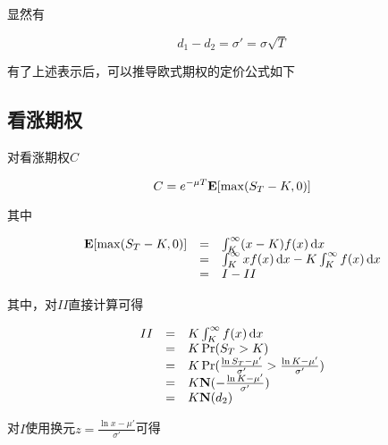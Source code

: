 显然有

\begin{equation*}
    d_1 - d_2 = \sigma' = \sigma \sqrt{T}
\end{equation*}

有了上述表示后，可以推导欧式期权的定价公式如下

\subsection{看涨期权}

对看涨期权$C$

\begin{equation}
    C = e^{-\mu T}\mathbf{E}[\max (S_T- K,0)]
\end{equation}

其中

\begin{equation}
    \begin{array}{rcl}
        \mathbf{E}[\max (S_T- K,0)] & = & \int_K^\infty(x - K)f(x) \,\mathrm{d} x                         \\
                            & = & \int_K^\infty xf(x) \,\mathrm{d} x - K \int_K^\infty f(x) \,\mathrm{d} x \\
                            & = & I - II
    \end{array}
\end{equation}

其中，对$II$直接计算可得

\begin{equation}
    \begin{array}{rcl}
        II & = & K \int_K^\infty f(x) \,\mathrm{d} x                                           \\
           & = & K \Pr(S_T > K)                                                       \\
           & = & K \Pr(\frac{\ln S_T - \mu'}{\sigma'} > \frac{\ln K - \mu'}{\sigma'}) \\
           & = & K \mathbf{N}( - \frac{\ln K - \mu'}{\sigma'})                                \\
           & = & K \mathbf{N}(d_2)
    \end{array}
\end{equation}

对$I$使用换元$z = \frac{\ln x - \mu'}{\sigma'}$可得


